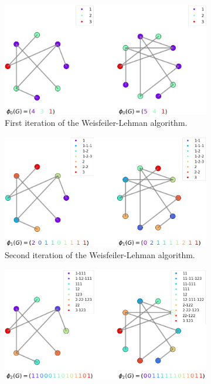 \begin{figure}
  \centering
  \begin{subfigure}[b]{0.49\textwidth}
    \centering
    \includegraphics[width=\textwidth]{./figures/WL/WL1.png}
    \caption{First iteration of the Weisfeiler-Lehman algorithm.}
  \end{subfigure}
  \hfill
  \begin{subfigure}[b]{0.49\textwidth}
    \centering
    \includegraphics[width=\textwidth]{./figures/WL/WL2.png}
    \caption{Second iteration of the Weisfeiler-Lehman algorithm.}
  \end{subfigure}
  \par\bigskip
  \begin{subfigure}[b]{0.5\textwidth}
    \centering
    \includegraphics[width=\textwidth]{./figures/WL/WL3.png}

\end{subfigure}
\end{figure}
